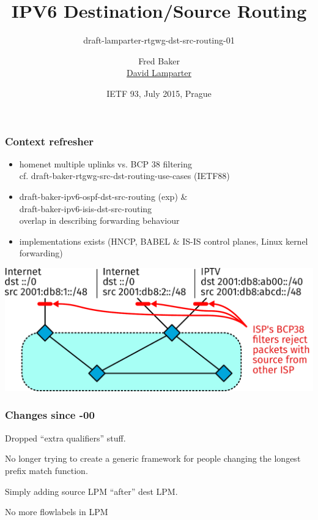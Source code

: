 \documentclass[14pt]{beamer}
\title{IPV6 Destination/Source Routing}
\subtitle{%
  draft-lamparter-rtgwg-dst-src-routing-01%
}
\author{%
  Fred Baker\\%
  \underline{David Lamparter}%
}
\date{IETF 93, July 2015, Prague}
\begin{document}
\begin{frame}
  \titlepage
\end{frame}

\begin{frame}
  \frametitle{Context refresher}
  \begin{itemize}
  \item homenet multiple uplinks vs. BCP 38 filtering\\%
    cf. draft-baker-rtgwg-src-dst-routing-use-cases (IETF88)
  \item draft-baker-ipv6-ospf-dst-src-routing (exp) \&\\%
    draft-baker-ipv6-isis-dst-src-routing\\%
    overlap in describing forwarding behaviour
  \item implementations exists
    (HNCP, BABEL \& IS-IS control planes, Linux kernel forwarding)
  \end{itemize}
\end{frame}

\begin{frame}
  \includegraphics[scale=0.45,angle=0]{intro_topo_bcp.pdf}%
\end{frame}

\begin{frame}
  \frametitle{Changes since -00}

  Dropped ``extra qualifiers'' stuff.

  \vspace{5mm}

  No longer trying to create a generic framework for people changing the
  longest prefix match function.

  \vspace{3mm}

  Simply adding source LPM ``after'' dest LPM.

  \vspace{5mm}

  {\footnotesize No more flowlabels in LPM}
\end{frame}
\end{document}
